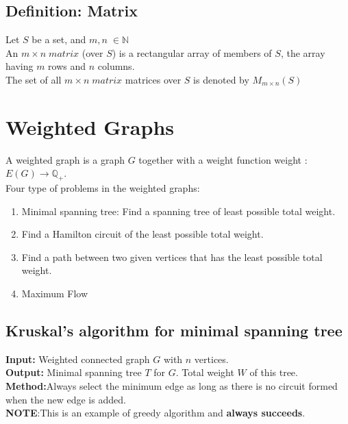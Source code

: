 \documentclass{article}
\begin{document}
\begin{spacing}{1.5}
\subsection{Definition: Matrix}
Let $S$ be a set, and $m,n \; \in \mathbb{N}  $\\
An $m \times n \; matrix $ (over $S$) is a rectangular array of members of $S$,
the array having $m$ rows and $n$ columns. \\
The set of all $m \times n \; matrix $ matrices over $S$ is denoted by $M_{m \times n}(S)$\\

\section{Weighted Graphs}
A weighted graph is a graph $G$ together with a weight function weight : $E(G) \rightarrow \mathbb{Q}_+ $. \\
Four type of problems in the weighted graphs:
\begin{enumerate}
    \item Minimal spanning tree:
    Find a spanning tree of least possible total weight.
    \item Find a Hamilton circuit of the least possible total weight.
    \item Find a path between two given vertices that has the least possible total weight.
    \item Maximum Flow 
\end{enumerate}
\subsection{Kruskal's algorithm for minimal spanning tree}
\textbf{Input:} Weighted connected graph $G$ with $n$ vertices.\\
\textbf{Output:} Minimal spanning tree $T$ for $G$. Total weight $W$ of this tree. \\
\textbf{Method:}Always select the minimum edge as long as there is no circuit formed when the new edge is added.\\ 
\textbf{NOTE}:This is an example of greedy algorithm and \textbf{always succeeds}. 


\end{spacing}
\end{document}
